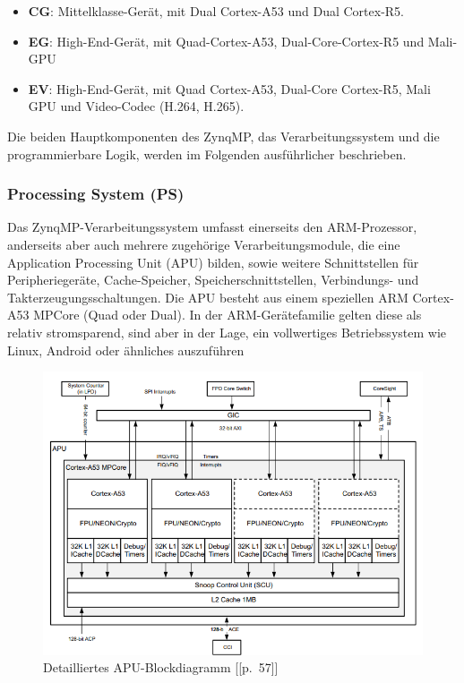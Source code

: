 \begin{itemize}
	\item \textbf{CG}: Mittelklasse-Gerät, mit Dual Cortex-A53 und Dual Cortex-R5.
	\item \textbf{EG}: High-End-Gerät, mit Quad-Cortex-A53, Dual-Core-Cortex-R5 und Mali-GPU
	\item \textbf{EV}: High-End-Gerät, mit Quad Cortex-A53, Dual-Core Cortex-R5, Mali GPU und Video-Codec (H.264, H.265).
\end{itemize}

Die beiden Hauptkomponenten des ZynqMP, das Verarbeitungssystem und die programmierbare Logik, werden im Folgenden ausführlicher beschrieben.

\subsubsection{Processing System (PS)}
Das ZynqMP-Verarbeitungssystem umfasst einerseits den ARM-Prozessor, anderseits aber auch mehrere zugehörige Verarbeitungsmodule, die eine Application Processing Unit (APU) bilden, sowie weitere Schnittstellen für Peripheriegeräte, Cache-Speicher, Speicherschnittstellen, Verbindungs- und Takterzeugungsschaltungen. Die APU besteht aus einem speziellen ARM Cortex-A53 MPCore (Quad oder Dual). In der ARM-Gerätefamilie gelten diese als relativ stromsparend, sind aber in der Lage, ein vollwertiges Betriebssystem wie Linux, Android oder ähnliches auszuführen

\begin{figure}[h]
	\begin{center}
		\includegraphics[width=1\textwidth]{./images/apu.jpg}
	\end{center}
	\vspace{-5pt}
	\caption[Detailliertes APU-Blockdiagramm]{Detailliertes APU-Blockdiagramm [\cite{Xilinx2017}[p.~57]]} %
	\label{fig:zynqmp:apu}
	\vspace{-5pt}
\end{figure}

